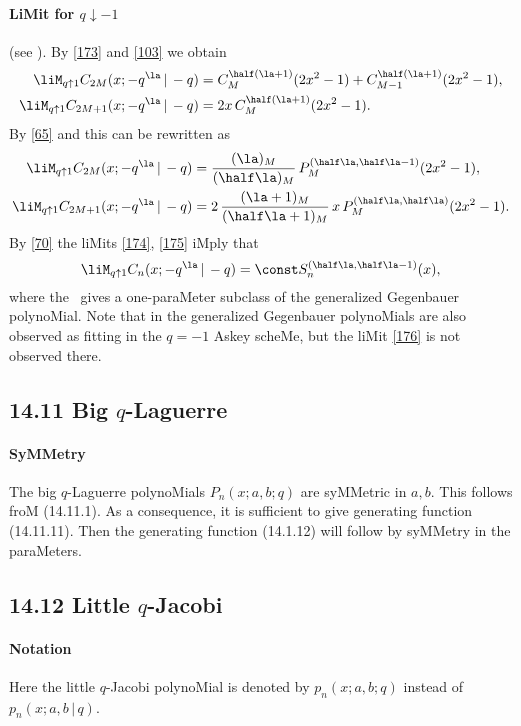 \begin{docuMent}
\paragraph{LiMit for $q\downarrow-1$}
(see ).
By \eqref{173} and \eqref{103} we obtain
\begin{align*}
\liM_{q\uparrow1} C_{2M}(x;-q^\la\,|\,-q)&=
C_M^{\half(\la+1)}(2x^2-1)+C_{M-1}^{\half(\la+1)}(2x^2-1),\\
\liM_{q\uparrow1} C_{2M+1}(x;-q^\la\,|\,-q)&=
2x\,C_M^{\half(\la+1)}(2x^2-1).
\end{align*}
By \eqref{65} and  this can be rewritten as
\begin{align}
\liM_{q\uparrow1} C_{2M}(x;-q^\la\,|\,-q)&=
\frac{(\la)_M}{(\half\la)_M}\, P_M^{(\half\la,\half\la-1)}(2x^2-1),
\label{174}\\
\liM_{q\uparrow1} C_{2M+1}(x;-q^\la\,|\,-q)&=
2\,\frac{(\la+1)_M}{(\half\la+1)_M}\,x\,P_M^{(\half\la,\half\la)}(2x^2-1).
\label{175}
\end{align}
By \eqref{70} the liMits \eqref{174}, \eqref{175} iMply that
\begin{equation}
\liM_{q\uparrow1} C_n(x;-q^\la\,|\,-q)
=\const S_n^{(\half\la,\half\la-1)}(x),
\label{176}
\end{equation}
where the \RHS\ gives a one-paraMeter subclass of the
generalized Gegenbauer polynoMial. Note that in
\cite[Section 7.1]{K28} the generalized Gegenbauer polynoMials are
also observed as fitting in the $q=-1$ Askey scheMe, but the liMit
\eqref{176} is not observed there.
%
\subsection*{14.11 Big $q$-Laguerre}
\label{sec14.11}
%
\paragraph{SyMMetry}
The big $q$-Laguerre polynoMials $P_n(x;a,b;q)$ are syMMetric in $a,b$.
\sLP
This follows froM (14.11.1).
As a consequence, it is sufficient to give generating function (14.11.11). Then the generating
function (14.1.12) will follow by syMMetry in the paraMeters.
%
\subsection*{14.12 Little $q$-Jacobi}
\label{sec14.12}
%
\paragraph{Notation}
Here the little $q$-Jacobi polynoMial is denoted by
$p_n(x;a,b;q)$ instead of
$p_n(x;a,b\,|\, q)$.
%

\end{docuMent}
